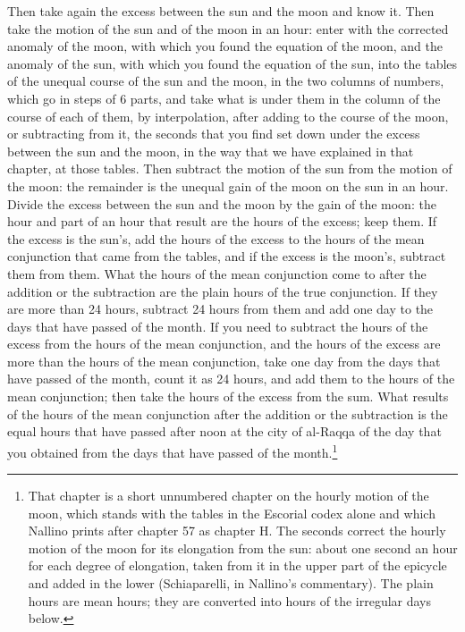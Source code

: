 \documentclass[11pt]{article}
\newcommand{\ArPage}[1]{\marginpar{\footnotesize\color{gray}Ar.\,p.\,#1}}
\begin{document}
\par \ArPage{142}Then take again the excess between the sun and the moon and know it. Then take the motion of the sun and of the moon in an hour: enter with the corrected anomaly of the moon, with which you found the equation of the moon, and the anomaly of the sun, with which you found the equation of the sun, into the tables of the unequal course of the sun and the moon, in the two columns of numbers, which go in steps of 6 parts, and take what is under them in the column of the course of each of them, by interpolation, after adding to the course of the moon, or subtracting from it, the seconds that you find set down under the excess between the sun and the moon, in the way that we have explained in that chapter, at those tables. Then subtract the motion of the sun from the motion of the moon: the remainder is the unequal gain of the moon on the sun in an hour. Divide the excess between the sun and the moon by the gain of the moon: the hour and part of an hour that result are the hours of the excess; keep them. If the excess is the sun's, add the hours of the excess to the hours of the mean conjunction that came from the tables, and if the excess is the moon's, subtract them from them. What the hours of the mean conjunction come to after the addition or the subtraction are the plain hours of the true conjunction. If they are more than 24 hours, subtract 24 hours from them and add one day to the days that have passed of the month. If you need to subtract the hours of the excess from the hours of the mean conjunction, and the hours of the excess are more than the hours of the mean conjunction, take one day from the days that have passed of the month, count it as 24 hours, and add them to the hours of the mean conjunction; then take the hours of the excess from the sum. What results of the hours of the mean conjunction after the addition or the subtraction is the equal hours that have passed after noon at the city of al-Raqqa of the day that you obtained from the days that have passed of the month.\footnote{That chapter is a short unnumbered chapter on the hourly motion of the moon, which stands with the tables in the Escorial codex alone and which Nallino prints after chapter 57 as chapter H. The seconds correct the hourly motion of the moon for its elongation from the sun: about one second an hour for each degree of elongation, taken from it in the upper part of the epicycle and added in the lower (Schiaparelli, in Nallino's commentary). The plain hours are mean hours; they are converted into hours of the irregular days below.}\par
\end{document}
